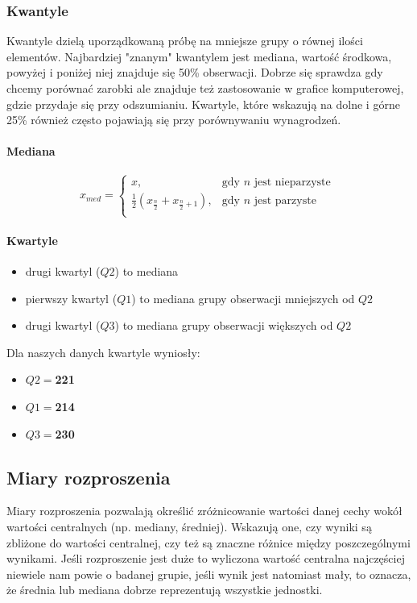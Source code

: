 \documentclass{article}
\theoremstyle{break}
\begin{document}
	\subsubsection*{Kwantyle}
	Kwantyle dzielą uporządkowaną próbę na mniejsze grupy o równej ilości elementów. Najbardziej "znanym" kwantylem jest mediana, wartość środkowa, powyżej i poniżej niej znajduje się 50\% obserwacji. Dobrze się sprawdza gdy chcemy porównać zarobki ale znajduje też zastosowanie w grafice komputerowej, gdzie przydaje się przy odszumianiu. Kwartyle, które wskazują na dolne i górne 25\% również często pojawiają się przy porównywaniu wynagrodzeń.
	\paragraph{Mediana}
	$$x_{med}=
	\begin{cases}
		x, &  \text{gdy $n$ jest nieparzyste }\\
		\frac{1}{2}(x_{\frac{n}{2}}+x_{\frac{n}{2}+1}), &  \text{gdy $n$ jest parzyste}\\
	\end{cases}$$
	\paragraph{Kwartyle}
	\begin{itemize}
		\item drugi kwartyl ($Q2$) to mediana
		\item pierwszy kwartyl ($Q1$) to mediana grupy obserwacji mniejszych od $Q2$
		\item drugi kwartyl ($Q3$) to mediana grupy obserwacji większych od $Q2$
	\end{itemize}
	Dla naszych danych kwartyle wyniosły:
	\begin{itemize}
		\item $Q2 = $\textbf{221}
		\item $Q1 = $\textbf{214}
		\item $Q3 = $\textbf{230}
	\end{itemize}
	\subsection{Miary rozproszenia}
	
	Miary rozproszenia pozwalają określić zróżnicowanie wartości danej cechy wokół wartości centralnych (np. mediany, średniej).  Wskazują one, czy wyniki są zbliżone do wartości centralnej, czy też są znaczne różnice między poszczególnymi wynikami. Jeśli rozproszenie jest duże to wyliczona wartość centralna najczęściej niewiele nam powie o badanej grupie, jeśli wynik jest natomiast mały, to oznacza, że średnia lub mediana dobrze reprezentują wszystkie jednostki.
	
\end{document}
